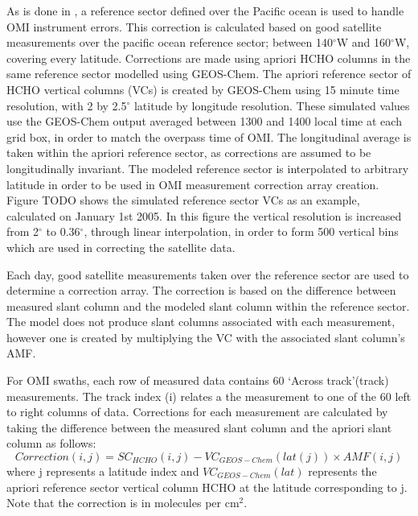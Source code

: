     As is done in \citet{Gonzalez2015}, a reference sector defined over the Pacific ocean is used to handle OMI instrument errors.
    This correction is calculated based on good satellite measurements over the pacific ocean reference sector; between 140$^{\circ}$W and 160$^{\circ}$W, covering every latitude.
    Corrections are made using apriori HCHO columns in the same reference sector modelled using GEOS-Chem.
    The apriori reference sector of HCHO vertical columns (VCs) is created by GEOS-Chem using 15 minute time resolution, with 2 by 2.5$^{\circ}$ latitude by longitude resolution.
    These simulated values use the GEOS-Chem output averaged between 1300 and 1400 local time at each grid box, in order to match the overpass time of OMI.
    The longitudinal average is taken within the apriori reference sector, as corrections are assumed to be longitudinally invariant.
    The modeled reference sector is interpolated to arbitrary latitude in order to be used in OMI measurement correction array creation.
    Figure TODO shows the simulated reference sector VCs as an example, calculated on January 1st 2005.
    In this figure the vertical resolution is increased from 2$^{\circ}$ to 0.36$^{\circ}$, through linear interpolation, in order to form 500 vertical bins which are used in correcting the satellite data.
    
    Each day, good satellite measurements taken over the reference sector are used to determine a correction array.
    The correction is based on the difference between measured slant column and the modeled slant column within the reference sector.
    The model does not produce slant columns associated with each measurement, however one is created by multiplying the VC with the associated slant column's AMF.
    
    For OMI swaths, each row of measured data contains 60 `Across track'(track) measurements.
    The track index (i) relates a the measurement to one of the 60 left to right columns of data.
    Corrections for each measurement are calculated by taking the difference between the measured slant column and the apriori slant column as follows:
    \begin{equation} \label{ch_isop:eqn:reference_sector_correction}
      Correction(i,j) = SC_{HCHO}(i,j) - VC_{GEOS-Chem}(lat(j)) \times {AMF}(i,j)
    \end{equation}
    where j represents a latitude index and $VC_{GEOS-Chem}(lat)$ represents the apriori reference sector vertical column HCHO at the latitude corresponding to j.
    Note that the correction is in molecules per cm$^2$.
    

